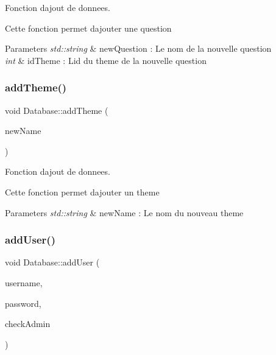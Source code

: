 Fonction d\textquotesingle{}ajout de donnees. 

Cette fonction permet d\textquotesingle{}ajouter une question 
\begin{DoxyParams}{Parameters}
{\em std\+::string} & new\+Question \+: Le nom de la nouvelle question \\
\hline
{\em int} & id\+Theme \+: L\textquotesingle{}id du theme de la nouvelle question \\
\hline
\end{DoxyParams}
\mbox{\label{classDatabase_a15faf1f7341da9efee62afacd31fb81d}} 
\subsubsection{\texorpdfstring{add\+Theme()}{addTheme()}}
{\footnotesize\ttfamily void Database\+::add\+Theme (\begin{DoxyParamCaption}\item[{string}]{new\+Name }\end{DoxyParamCaption})}



Fonction d\textquotesingle{}ajout de donnees. 

Cette fonction permet d\textquotesingle{}ajouter un theme 
\begin{DoxyParams}{Parameters}
{\em std\+::string} & new\+Name \+: Le nom du nouveau theme \\
\hline
\end{DoxyParams}
\mbox{\label{classDatabase_a5e69b420a56127d86aca142683e03cbf}} 
\subsubsection{\texorpdfstring{add\+User()}{addUser()}}
{\footnotesize\ttfamily void Database\+::add\+User (\begin{DoxyParamCaption}\item[{string}]{username,  }\item[{string}]{password,  }\item[{int}]{check\+Admin }\end{DoxyParamCaption})}



